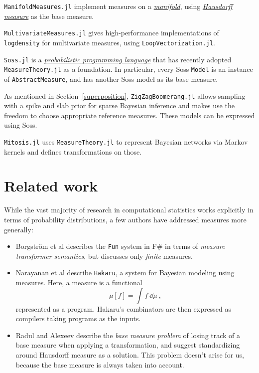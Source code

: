 \documentclass{juliacon}
\begin{document}
\verb|ManifoldMeasures.jl|\cite{manifoldmeasures} implement measures on a \href{https://en.wikipedia.org/wiki/Manifold}{\emph{manifold}}, using \href{https://en.wikipedia.org/wiki/Hausdorff_measure}{\emph{Hausdorff measure}} as the base measure.

\verb|MultivariateMeasures.jl|\cite{multivariatemeasures} gives high-performance implementations of \verb|logdensity| for multivariate measures, using \verb|LoopVectorization.jl|\cite{loopvectorization}.

\verb|Soss.jl|\cite{scherrer2020soss} is a \href{https://en.wikipedia.org/wiki/Probabilistic_programming}{\emph{probabilistic programming language}} that has recently adopted \verb|MeasureTheory.jl| as a foundation. In particular, every Soss \verb|Model| is an instance of \verb|AbstractMeasure|, and has another Soss model as its base measure.

As mentioned in Section~\ref{superposition}, \verb|ZigZagBoomerang.jl|\cite{https://doi.org/10.5281/zenodo.3931118} allows sampling with a spike and slab prior for sparse Bayesian inference and makes use the freedom to choose appropriate reference measures.  These models can be expressed using Soss.

\verb|Mitosis.jl|\cite{arxiv2010.03509} uses \verb|MeasureTheory.jl| to represent Bayesian networks via Markov kernels and defines transformations on those.



\section{Related work}

While the vast majority of research in computational statistics works explicitly in terms of probability distributions, a few authors have addressed measures more generally:

\begin{itemize}
\item Borgstr\"om et al \cite{Borgstr_m_2013} describes the \verb|Fun| system in F\# in terms of \emph{measure transformer semantics}, but discusses only \emph{finite} measures.

\item Narayanan et al \cite{narayanan2016probabilistic} describe \verb|Hakaru|, a system for Bayesian modeling using measures. Here, a measure is a functional
\[
\mu[f] = \int f\ \dd\mu\ ,
\]
represented as a program. Hakaru's combinators are then expressed as compilers taking programs as the inputs.

\item Radul and Alexeev \cite{Radul2020} describe the \emph{base measure problem} of losing track of a base measure when applying a transformation, and suggest standardizing around Hausdorff measure as a solution. This problem doesn't arise for us, because the base measure is always taken into account.


\end{itemize}
\end{document}
